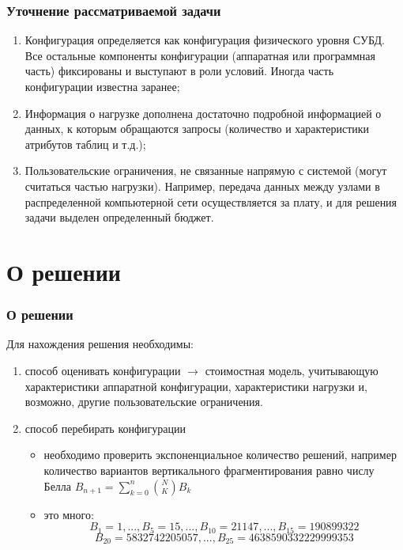 \documentclass[unicode]{beamer}
\begin{document}
\begin{frame}
\frametitle{Уточнение рассматриваемой задачи}

\begin{enumerate}
  \setlength\itemsep{1em}	
  \item Конфигурация определяется как конфигурация физического уровня СУБД. Все остальные компоненты конфигурации (аппаратная или программная часть) фиксированы и выступают в роли условий. Иногда \cite{p6} часть конфигурации известна заранее;
  \item Информация о нагрузке дополнена достаточно подробной информацией о данных, к которым обращаются запросы (количество и характеристики атрибутов таблиц и т.д.);
  \item Пользовательские ограничения, не связанные напрямую с системой (могут считаться частью нагрузки). Например, передача данных между узлами в распределенной компьютерной сети осуществляется за плату, и для решения задачи выделен определенный бюджет.
\end{enumerate}

\end{frame}



\section{О решении}

\begin{frame}
\frametitle{О решении}

Для нахождения решения необходимы:
\begin{enumerate}
  \setlength\itemsep{1em}
  \item способ оценивать конфигурации $\rightarrow$ \alert{стоимостная модель}, учитывающую характеристики аппаратной конфигурации, характеристики нагрузки и, возможно, другие пользовательские ограничения.
  \item способ перебирать конфигурации
    \begin{itemize}
      \item необходимо проверить экспоненциальное количество решений, например количество вариантов вертикального фрагментирования равно числу Белла $B_{n+1} = \sum\limits_{k = 0}^n \binom{N}{K} B_{k}$
      \item это много: $$B_1 = 1, ..., B_5 = 15, ..., B_{10} = 21147, ..., B_{15} = 190899322 $$ $$ B_{20} = 5832742205057, ..., B_{25} = 4638590332229999353$$
    \end{itemize}
\end{enumerate}

\end{frame}
\end{document}
